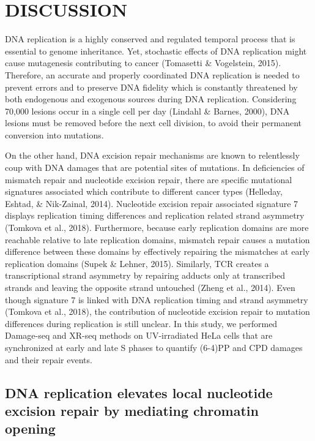\setlength{\parindent}{0pt}
\chapter{\bf DISCUSSION}

DNA replication is a highly conserved and regulated temporal process that is essential to genome inheritance. Yet, stochastic effects of DNA replication might cause mutagenesis contributing to cancer (Tomasetti \& Vogelstein, 2015). Therefore, an accurate and properly coordinated DNA replication is needed to prevent errors and to preserve DNA fidelity which is constantly threatened by both endogenous and exogenous sources during DNA replication. Considering 70,000 lesions occur in a single cell per day (Lindahl \& Barnes, 2000), DNA lesions must be removed before the next cell division, to avoid their permanent conversion into mutations. 

On the other hand, DNA excision repair mechanisms are known to relentlessly coup with DNA damages that are potential sites of mutations. In deficiencies of mismatch repair and nucleotide excision repair, there are specific mutational signatures associated which contribute to different cancer types (Helleday, Eshtad, \& Nik-Zainal, 2014). Nucleotide excision repair associated signature 7 displays replication timing differences and replication related strand asymmetry (Tomkova et al., 2018). Furthermore, because early replication domains are more reachable relative to late replication domains, mismatch repair causes a mutation difference between these domains by effectively repairing the mismatches at early replication domains (Supek \& Lehner, 2015). Similarly, TCR creates a transcriptional strand asymmetry by repairing adducts only at transcribed strands and leaving the opposite strand untouched (Zheng et al., 2014). Even though signature 7 is linked with DNA replication timing and strand asymmetry (Tomkova et al., 2018), the contribution of nucleotide excision repair to mutation differences during replication is still unclear. In this study, we performed Damage-seq and XR-seq methods on UV-irradiated HeLa cells that are synchronized at early and late S phases to quantify (6-4)PP and CPD damages and their repair events. 

\section{DNA replication elevates local nucleotide excision repair by mediating chromatin opening}

